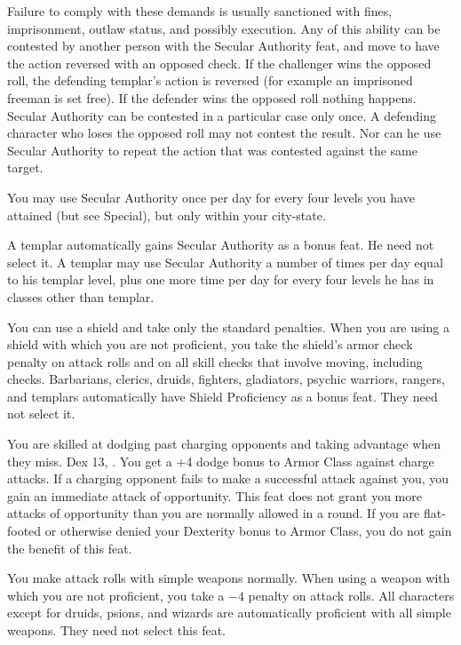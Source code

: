 {Failure to comply with these demands is usually sanctioned with fines, imprisonment, outlaw status, and possibly execution. Any of this ability can be contested by another person with the Secular Authority feat, and move to have the action reversed with an opposed  check. If the challenger wins the opposed roll, the defending templar's action is reversed (for example an imprisoned freeman is set free). If the defender wins the opposed roll nothing happens. Secular Authority can be contested in a particular case only once. A defending character who loses the opposed roll may not contest the result. Nor can he use Secular Authority to repeat the action that was contested against the same target.

You may use Secular Authority once per day for every four levels you have attained (but see Special), but only
within your city-state.}
{}
{A templar automatically gains Secular Authority as a bonus feat. He need not select it. A templar may use Secular Authority a number of times per day equal to his templar level, plus one more time per day for every four levels he has in classes other than templar.}

{}{}
{You can use a shield and take only the standard penalties.}
{When you are using a shield with which you are not proficient, you take the shield's armor check penalty on attack rolls and on all skill checks that involve moving, including  checks.}
{Barbarians, clerics, druids, fighters, gladiators, psychic warriors, rangers, and templars automatically have Shield Proficiency as a bonus feat. They need not select it.}

{You are skilled at dodging past charging opponents and taking advantage when they miss.}
{Dex 13, .}
{You get a +4 dodge bonus to Armor Class against charge attacks. If a charging opponent fails to make a successful attack against you, you gain an immediate attack of opportunity. This feat does not grant you more attacks of opportunity than you are normally allowed in a round. If you are flat-footed or otherwise denied your Dexterity bonus to Armor Class, you do not gain the benefit of this feat.}{}{}

{}{}
{You make attack rolls with simple weapons normally.}
{When using a weapon with which you are not proficient, you take a $-4$ penalty on attack rolls.}
{All characters except for druids, psions, and wizards are automatically proficient with all simple weapons. They need not select this feat.}

